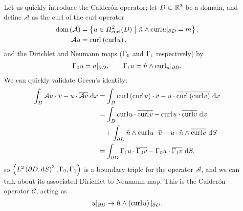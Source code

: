 Let us quickly introduce the Calder\'{o}n operator; let $D\subset\mathbb{R}^3$ be a domain, and define $\mathcal{A}$ as the curl of the curl operator
\begin{align*}
	\mathrm{dom}\left( \mathcal{A} \right) &= \left\{  u\in H^2_{\mathrm{curl}}(D) \ \middle\vert \  \hat{n}\wedge\mathrm{curl}_{}u\vert_{\partial D} = m  \right\}, \\
	\mathcal{A}u &= \mathrm{curl}_{}\left( \mathrm{curl}_{}u \right),
\end{align*}
and the Dirichlet and Neumann maps ($\Gamma_0$ and $\Gamma_1$ respectively) by
\begin{align} \label{eq:ClassicalEM-DNMaps}
	\Gamma_0 u = u\vert_{\partial D}, \qquad
	\Gamma_1 u = \hat{n}\wedge\mathrm{curl}_{u}\vert_{\partial D}.
\end{align}
We can quickly validate Green's identity:
\begin{align*}
	\int_{D} \mathcal{A}u \cdot \overline{v} - u \cdot \overline{\mathcal{A}v}  \ \mathrm{d}x
	&= \int_{D} \mathrm{curl}_{}\left( \mathrm{curl}_{}u \right)\cdot\overline{v} - u\cdot\overline{\mathrm{curl}_{}\left( \mathrm{curl}_{}v \right)}  \ \mathrm{d}x \\
	&= \int_{D} \mathrm{curl}_{}u\cdot\overline{\mathrm{curl}_{}v} - \mathrm{curl}_{}u\cdot\overline{\mathrm{curl}_{}v}  \ \mathrm{d}x \\
	&\quad + \int_{\partial D} \hat{n}\wedge\mathrm{curl}_{}u\cdot\overline{v} - u\cdot\hat{n}\wedge\overline{\mathrm{curl}_{}v}  \ \mathrm{d}S \\
	&= \int_{\partial D} \Gamma_1 u \cdot \overline{\Gamma_0 v} - \Gamma_0 u \cdot \overline{\Gamma_1 v}  \ \mathrm{d}S,
\end{align*}
so $\left( L^{2}\left( \partial D,\mathrm{d} S \right)^3, \Gamma_0, \Gamma_1 \right)$ is a boundary triple for the operator $\mathcal{A}$, and we can talk about its associated Dirichlet-to-Neumann map.
This is the Calder\'{o}n operator $\mathcal{C}$, acting as
\begin{align*}
	u\vert_{\partial D} \rightarrow \hat{n}\wedge\left( \mathrm{curl}_{}u \right)\vert_{\partial D}.
\end{align*}

